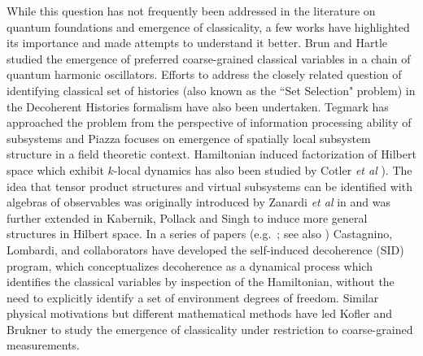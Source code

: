 \documentclass[aps,pra,onecolumn,nofootinbib,12pt,tightenlines]{revtex4-1}
\begin{document}
While this question has not frequently been addressed in the literature on quantum foundations and emergence of classicality, 
a few works have highlighted its importance and made attempts to understand it better. Brun and Hartle \cite{brun1999classical} studied 
the emergence of preferred coarse-grained classical variables in a chain of quantum harmonic oscillators. Efforts to address the closely related 
question of identifying classical set of histories (also known as the ``Set Selection" problem) in the Decoherent Histories 
formalism \cite{gell2019alternative,dowker1996consistent,kent1998quantum,riedel2012,Griffiths:1984rx,paz1993environment} have also been undertaken.
 Tegmark \cite{tegmark2015consciousness} has approached the problem from the perspective of information processing ability of subsystems and
 Piazza \cite{Piazza:2005wm} focuses on emergence of spatially local subsystem structure in a field theoretic context. 
Hamiltonian induced factorization of Hilbert space which exhibit $k$-local dynamics has also been studied by Cotler
 \emph{et al} \cite{cotler2019locality}). The idea that tensor product structures and virtual subsystems can be identified with algebras
 of observables was originally introduced by Zanardi \emph{et al} in \cite{Zanardi:2001zz,Zanardi:2004zz} and was further extended in
 Kabernik, Pollack and Singh \cite{Kabernik:2019jko} to induce more general structures in Hilbert space. In a series of papers
 (e.g.\ \cite{2004SHPMP..35...73C,Castagnino:2008zz,10.1007/978-94-007-2404-4_15,2014BrJPh..44..138F}; see also \cite{2005PhRvA..72a2109S})
 Castagnino, Lombardi, and collaborators have developed the self-induced decoherence (SID) program, which conceptualizes decoherence as a
 dynamical process which identifies the classical variables by inspection of the Hamiltonian, without the need to explicitly identify a
 set of environment degrees of freedom. Similar physical motivations but different mathematical methods have led Kofler and 
Brukner \cite{2007PhRvL..99r0403K} to study the emergence of classicality under restriction to coarse-grained measurements.
\end{document}
